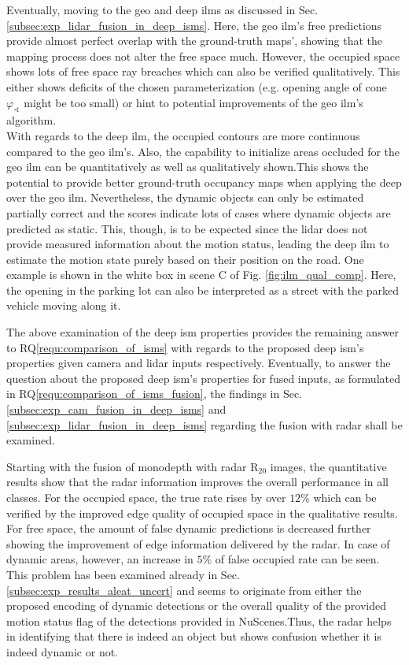Eventually, moving to the geo and deep \gls{ilm}s as discussed in Sec. \ref{subsec:exp_lidar_fusion_in_deep_isms}. Here, the geo \gls{ilm}'s free predictions provide almost perfect overlap with the ground-truth maps', showing that the mapping process does not alter the free space much. However, the occupied space shows lots of free space ray breaches which can also be verified qualitatively. This either shows deficits of the chosen parameterization (e.g. opening angle of cone $\varphi_\sphericalangle$ might be too small) or hint to potential improvements of the geo \gls{ilm}'s algorithm.\\
With regards to the deep \gls{ilm}, the occupied contours are more continuous compared to the geo \gls{ilm}'s. Also, the capability to initialize areas occluded for the geo \gls{ilm} can be quantitatively as well as qualitatively shown.This shows the potential to provide better ground-truth occupancy maps when applying the deep over the geo \gls{ilm}. Nevertheless, the dynamic objects can only be estimated partially correct and the scores indicate lots of cases where dynamic objects are predicted as static. This, though, is to be expected since the lidar does not provide measured information about the motion status, leading the deep \gls{ilm} to estimate the motion state purely based on their position on the road. One example is shown in the white box in scene C of Fig. \ref{fig:ilm_qual_comp}. Here, the opening in the parking lot can also be interpreted as a street with the parked vehicle moving along it.

The above examination of the deep \gls{ism} properties provides the remaining answer to RQ\ref{requ:comparison_of_isms} with regards to the proposed deep \gls{ism}'s properties given camera and lidar inputs respectively. Eventually, to answer the question about the proposed deep \gls{ism}'s properties for fused inputs, as formulated in RQ\ref{requ:comparison_of_isms_fusion}, the findings in Sec. \ref{subsec:exp_cam_fusion_in_deep_isms} and \ref{subsec:exp_lidar_fusion_in_deep_isms} regarding the fusion with radar shall be examined.

Starting with the fusion of \gls{monodepth} with radar R$_{20}$ images, the quantitative results show that the radar information improves the overall performance in all classes. For the occupied space, the true rate rises by over $12\%$ which can be verified by the improved edge quality of occupied space in the qualitative results. For free space, the amount of false dynamic predictions is decreased further showing the improvement of edge information delivered by the radar. In case of dynamic areas, however, an increase in $5\%$ of false occupied rate can be seen. This problem has been examined already in Sec. \ref{subsec:exp_results_aleat_uncert} and seems to originate from either the proposed encoding of dynamic detections or the overall quality of the provided motion status flag of the detections provided in NuScenes.Thus, the radar helps in identifying that there is indeed an object but shows confusion whether it is indeed dynamic or not.  

